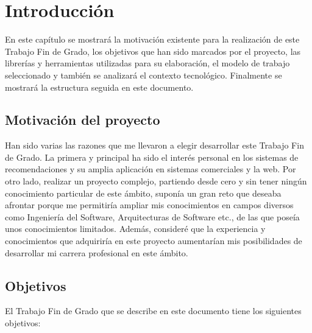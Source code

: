 \chapter{Introducción}

En este capítulo se mostrará la motivación existente para la realización de este Trabajo Fin de Grado, los objetivos que han sido marcados por el proyecto, las librerías y herramientas utilizadas para su elaboración, el modelo de trabajo seleccionado y también se analizará el contexto tecnológico. Finalmente se mostrará la estructura seguida en este documento.

\section{Motivación del proyecto}

Han sido varias las razones que me llevaron a elegir desarrollar este Trabajo Fin de Grado. La primera y principal ha sido el interés personal en los sistemas de recomendaciones y su amplia aplicación en sistemas comerciales y la web. Por otro lado, realizar un proyecto complejo, partiendo desde cero y sin tener ningún conocimiento particular de este ámbito, suponía un gran reto que deseaba afrontar porque me permitiría ampliar mis conocimientos en campos diversos como Ingeniería del Software, Arquitecturas de Software etc., de las que poseía unos conocimientos limitados. Además, consideré que la experiencia y conocimientos que adquiriría en este proyecto aumentarían mis posibilidades de desarrollar mi carrera profesional en este ámbito.

\section{Objetivos}

El Trabajo Fin de Grado que se describe en este documento tiene los siguientes objetivos:

